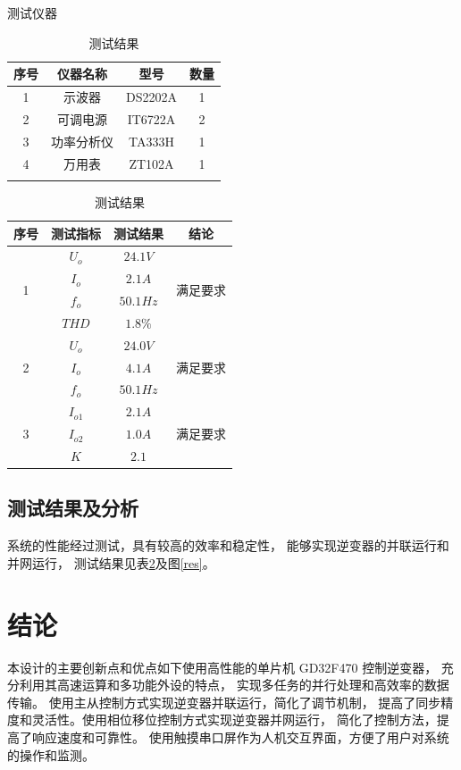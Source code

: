 \documentclass[a4paper,12pt]{article}
\begin{document}
\begin{table}[H]
    \centering
    \begin{minipage}{0.45\textwidth}
    \caption{测试仪器}
    \begin{tabular}{cccc}
    \toprule
    序号 & 仪器名称 & 型号 & 数量  \\ \midrule
    1 & 示波器 & DS2202A & 1\\
    2 & 可调电源 & IT6722A & 2 \\
    3 & 功率分析仪 & TA333H & 1 \\
    4 & 万用表 &  ZT102A & 1
    \\ \bottomrule
    \label{tab1}
    \end{tabular}
    \end{minipage}
    \quad
    \begin{minipage}{0.45\textwidth}
    \centering
    \caption{测试结果}
    \begin{tabular}{@{}cccc@{}}
    \toprule
    序号 & 测试指标 & 测试结果 & 结论 \\ \midrule
    \multirow{4}{*}{1} & $U_o$ & $24.1V$ & \multirow{4}{*}{满足要求} \\
     & $I_o$ & $2.1A$ &  \\
     & $f_o$ & $50.1Hz$ &  \\
     & $THD$ & $1.8\%$ &  \\ \midrule
    \multirow{3}{*}{2} & $U_o$ & $24.0V$ & \multirow{3}{*}{满足要求} \\
        & $I_o$ & $4.1A$ &  \\
        & $f_o$ & $50.1Hz$ &  \\ \midrule
    \multirow{3}{*}{3} & $I_{o1}$ & $2.1A$ & \multirow{3}{*}{满足要求} \\
        & $I_{o2}$ & $1.0A$ &  \\
        & $K$ & $2.1$ &  \\ \bottomrule
    \end{tabular}
    \label{tab2}
    \end{minipage}
\end{table}
\newpage
\subsection{测试结果及分析}
系统的性能经过测试，具有较高的效率和稳定性，
能够实现逆变器的并联运行和并网运行，
测试结果见表\ref{tab2}及图\ref{res}。

\section{结论}
本设计的主要创新点和优点如下使用高性能的单片机 GD32F470 控制逆变器，
充分利用其高速运算和多功能外设的特点，
实现多任务的并行处理和高效率的数据传输。
使用主从控制方式实现逆变器并联运行，简化了调节机制，
提高了同步精度和灵活性。使用相位移位控制方式实现逆变器并网运行，
简化了控制方法，提高了响应速度和可靠性。
使用触摸串口屏作为人机交互界面，方便了用户对系统的操作和监测。
\end{document}
